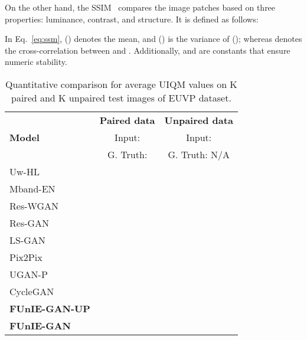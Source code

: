 \documentclass[10pt,twocolumn,letterpaper]{article}
\begin{document}
On the other hand, the SSIM~\cite{wang2004image} compares the image patches based on three properties: luminance, contrast, and structure. It is defined as follows:  


In Eq.~\ref{eq:ssm},  () denotes the mean, and  () is the variance of  (); whereas  denotes the cross-correlation between  and . Additionally,  and  are constants that ensure numeric stability.





\begin{table}
\centering
\caption{Quantitative comparison for average UIQM values on K paired and K unpaired  test images of EUVP dataset.}
\scriptsize
\begin{tabular}{l||c|c}
  \hline
   & \textbf{Paired data} & \textbf{Unpaired data} \\ 
  \textbf{Model} & Input:  & Input:   \\
  & G. Truth:  & G. Truth: N/A  \\ \hline \hline 
  Uw-HL &  &  \\ \hline 
  Mband-EN &   &  \\ \hline
  Res-WGAN &  &  \\ \hline
  Res-GAN &  &  \\ \hline
  LS-GAN &  &  \\ \hline
  Pix2Pix &  &  \\ \hline
  UGAN-P &  &  \\ \hline
  CycleGAN &  &  \\ \hline
  \textbf{FUnIE-GAN-UP} &  &  \\ \hline
  \textbf{FUnIE-GAN} &   &  \\ \hline
\end{tabular}
\label{tab:uiqm}
\vspace{-3mm}
\end{table}
\end{document}
